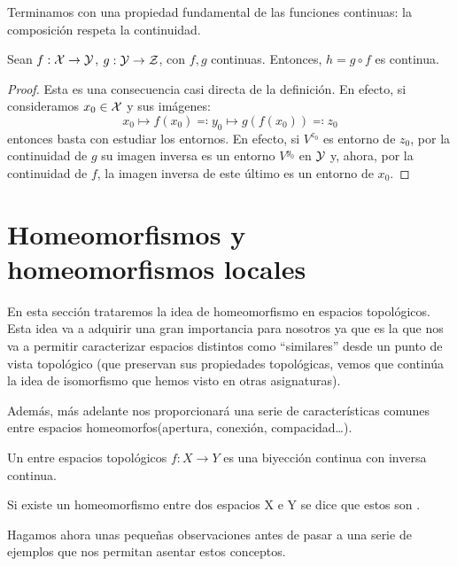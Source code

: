 Terminamos con una propiedad fundamental de las funciones continuas: la composición respeta la continuidad.

\begin{prop}
	Sean $f:\mathcal{X}\to\mathcal{Y}$, $g:\mathcal{Y}\to\mathcal{Z}$, con $f,g$ continuas. Entonces, $h = g\circ f$ es continua.
	
	\begin{proof}
		Esta es una consecuencia casi directa de la definición. En efecto, si consideramos $x_0\in\mathcal{X}$ y sus imágenes:
		\[x_0\mapsto f(x_0)\eqqcolon y_0\mapsto g(f(x_0))\eqqcolon z_0\]
		entonces basta con estudiar los entornos. En efecto, si $V^{z_0}$ es entorno de $z_0$, por la continuidad de $g$ su imagen inversa es un entorno $V^{y_0}$ en $\mathcal{Y}$ y, ahora, por la continuidad de $f$, la imagen inversa de este último es un entorno de $x_0$.
	\end{proof}
\end{prop}

\section{Homeomorfismos y homeomorfismos locales}
\label{cont_homeomorfismos}

En esta sección trataremos la idea de homeomorfismo en espacios topológicos. Esta idea va a adquirir una gran importancia para nosotros ya que es la que nos va a permitir caracterizar espacios distintos como ``similares'' desde un punto de vista topológico (que preservan sus propiedades topológicas, vemos que continúa la idea de isomorfismo que hemos visto en otras asignaturas).


Además, más adelante nos proporcionará una serie de características comunes entre espacios homeomorfos(apertura, conexión, compacidad\dots).

\label{cont_def_homeomorfismo}

\begin{defi}[Homeomorfismo]
	Un  entre espacios topológicos $f\colon X\rightarrow Y$ es una biyección continua con inversa continua.
	
	Si existe un homeomorfismo entre dos espacios X e Y se dice que estos son .
\end{defi}

Hagamos ahora unas pequeñas observaciones antes de pasar a una serie de ejemplos que nos permitan asentar estos conceptos.

